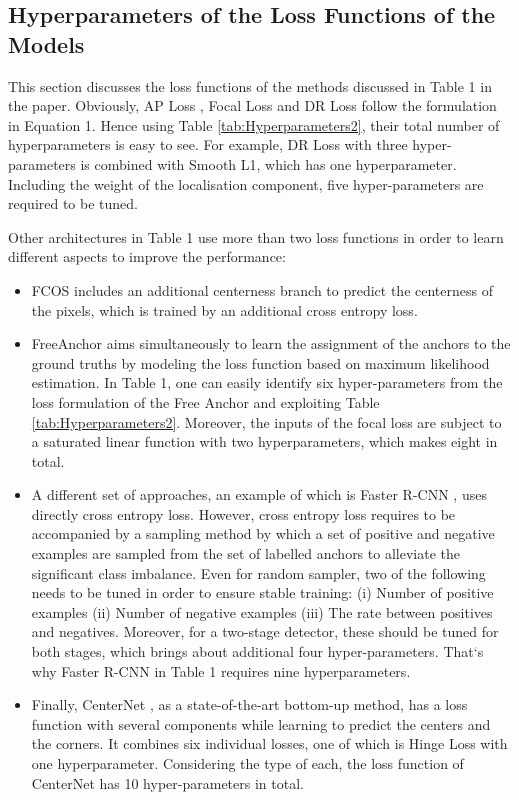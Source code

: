 \documentclass{article}
\begin{document}
\subsection{Hyperparameters of the Loss Functions of the Models}
This section discusses the loss functions of the methods discussed in Table 1 in the paper. Obviously, AP Loss \cite{APLoss}, Focal Loss \cite{FocalLoss} and DR Loss \cite{DRLoss} follow the formulation in Equation 1. Hence using Table \ref{tab:Hyperparameters2}, their total number of hyperparameters is easy to see. For example, DR Loss with three hyper-parameters is combined with Smooth L1, which has one hyperparameter. Including the weight of the localisation component, five hyper-parameters are required to be tuned.

Other architectures in Table 1 use more than two loss functions in order to learn different aspects to improve the performance:
\begin{itemize}
    \item FCOS \cite{FCOS} includes an additional centerness branch to predict the centerness of the pixels, which is trained by an additional cross entropy loss.
    \item FreeAnchor \cite{FreeAnchor} aims simultaneously to learn the assignment of the anchors to the ground truths by modeling the loss function based on maximum likelihood estimation. In Table 1, one can easily identify six hyper-parameters from the loss formulation of the Free Anchor and exploiting Table \ref{tab:Hyperparameters2}. Moreover, the inputs of the focal loss are subject to a saturated linear function with two hyperparameters, which makes eight in total.
    \item  A different set of approaches, an example of which is Faster R-CNN \cite{FasterRCNN}, uses directly cross entropy loss. However, cross entropy loss requires to be accompanied by a sampling method by which a set of positive and negative examples are sampled from the set of labelled anchors to alleviate the significant class imbalance. Even for random sampler, two of the following needs to be tuned in order to ensure stable training: (i) Number of positive examples (ii) Number of negative examples (iii) The rate between positives and negatives. Moreover, for a two-stage detector, these should be tuned for both stages, which brings about additional four hyper-parameters. That`s why Faster R-CNN \cite{FasterRCNN} in Table 1 requires nine hyperparameters.
    \item  Finally, CenterNet \cite{CenterNet}, as a state-of-the-art bottom-up method, has a loss function with several components while learning to predict the centers and the corners. It combines six individual losses, one of which is Hinge Loss with one hyperparameter. Considering the type of each, the loss function of CenterNet \cite{CenterNet} has 10 hyper-parameters in total.
\end{itemize}
\end{document}
